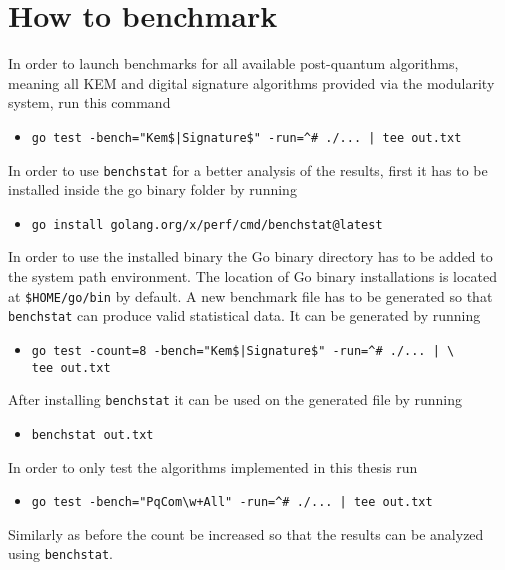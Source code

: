 \section{How to benchmark}
\label{sec:how_to_bench}
In order to launch benchmarks for all available post-quantum algorithms, meaning all KEM and digital signature algorithms provided via the modularity system, run this command
\begin{itemize}
  \item \texttt{go test -bench="Kem\$|Signature\$" -run=\^{}\# ./... | tee out.txt}
\end{itemize}
In order to use \texttt{benchstat} for a better analysis of the results, first it has to be installed inside the go binary folder by running
\begin{itemize}
  \item \texttt{go install golang.org/x/perf/cmd/benchstat@latest}
\end{itemize}
In order to use the installed binary the Go binary directory has to be added to the system path environment. The location of Go binary installations is located at \texttt{\$HOME/go/bin} by default. A new benchmark file has to be generated so that \texttt{benchstat} can produce valid statistical data. It can be generated by running
\begin{itemize}
  \item \texttt{go test -count=8 -bench="Kem\$|Signature\$" -run=\^{}\# ./... | \textbackslash\\tee out.txt}
\end{itemize}
After installing \texttt{benchstat} it can be used on the generated file by running
\begin{itemize}
  \item \texttt{benchstat out.txt}
\end{itemize}
In order to only test the algorithms implemented in this thesis run
\begin{itemize}
  \item \texttt{go test -bench="PqCom\textbackslash w+All" -run=\^{}\# ./... | tee out.txt}
\end{itemize}
Similarly as before the count be increased so that the results can be analyzed using \texttt{benchstat}.
